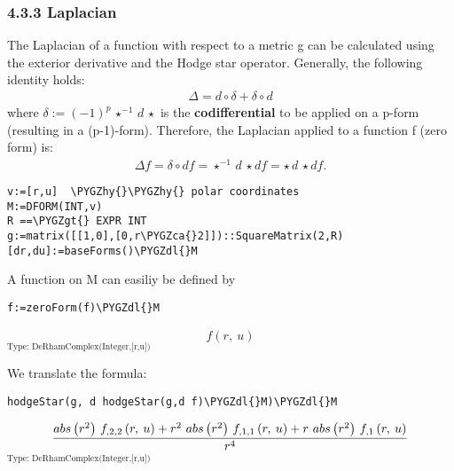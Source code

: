 \documentclass[letterpaper,10pt,english]{sphinxmanual}
\def\PYGZca{\char`\^}
\def\PYGZgt{\char`\>}
\def\PYGZdl{\char`\$}
\def\PYGZhy{\char`\-}
\begin{document}
\subsubsection{4.3.3 Laplacian}
\label{section-4.0:laplacian}
The Laplacian of a function with respect to a metric g can be calculated
using the exterior derivative and the Hodge star operator. Generally, the
following identity holds:
\begin{equation*}
\begin{split}\Delta = d \circ \delta + \delta \circ d\end{split}
\end{equation*}
where \(\delta:=(-1)^p\, \star^{-1}\,d \,\star\) is the \textbf{codifferential}
to be applied on a p-form (resulting in a (p-1)-form). Therefore, the
Laplacian applied to a function f (zero form) is:
\begin{equation*}
\begin{split}\Delta f = \delta \circ df = \star^{-1}\, d \,\star df=
\star\, d \, \star df.\end{split}
\end{equation*}
\begin{Verbatim}[commandchars=\\\{\}]
v:=[r,u]  \PYGZhy{}\PYGZhy{} polar coordinates
M:=DFORM(INT,v)
R ==\PYGZgt{} EXPR INT
g:=matrix([[1,0],[0,r\PYGZca{}2]])::SquareMatrix(2,R)
[dr,du]:=baseForms()\PYGZdl{}M
\end{Verbatim}

A function on M can easiliy be defined by

\begin{Verbatim}[commandchars=\\\{\}]
f:=zeroForm(f)\PYGZdl{}M
\end{Verbatim}
\begin{equation*}
\begin{split}f\left({r, \: u}\right)\end{split}
\end{equation*}
$_{\text{Type: DeRhamComplex(Integer,{[}r,u{]})}}$

We translate the formula:

\begin{Verbatim}[commandchars=\\\{\}]
hodgeStar(g, d hodgeStar(g,d f)\PYGZdl{}M)\PYGZdl{}M
\end{Verbatim}
\begin{equation*}
\begin{split}{{{abs
\left(
{{{r} ^ {2}}}
\right)}
\  {{f _ {{{,2}{,2}}}}
\left(
{r, \: u}
\right)}}+{{{r}
^ {2}} \  {abs
\left(
{{{r} ^ {2}}}
\right)}
\  {{f _ {{{,1}{,1}}}}
\left(
{r, \: u}
\right)}}+{r
\  {abs
\left(
{{{r} ^ {2}}}
\right)}
\  {{f _ {{,1}}}
\left(
{r, \: u}
\right)}}}
\over {{r} ^ {4}}\end{split}
\end{equation*}
$_{\text{Type: DeRhamComplex(Integer,{[}r,u{]})}}$
\end{document}
